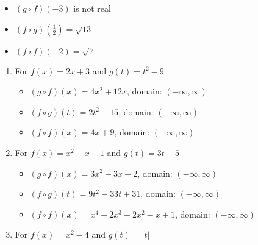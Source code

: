 \begin{enumerate}
\begin{multicols}{3}

\begin{itemize}

\item  $(g\circ f)(-3)$ is not real

\item  $(f\circ g)\left(\frac{1}{2}\right) = \sqrt{13}$

\item  $(f \circ f)(-2) = \sqrt{7}$

\end{itemize}

\end{multicols}
\setcounter{HW}{\value{enumi}}
\end{enumerate}

\begin{enumerate}
\setcounter{enumi}{\value{HW}}

\item For $f(x) = 2x+3$ and $g(t) = t^2-9$

\begin{itemize}

\item  $(g \circ f)(x) = 4x^2+12x$, domain: $(-\infty, \infty)$

\item  $(f \circ g)(t) = 2t^2-15$, domain: $(-\infty, \infty)$

\item  $(f \circ f)(x) = 4x+9$, domain: $(-\infty, \infty)$

\end{itemize}


\item For  $f(x) = x^2 -x+1$ and $g(t) = 3t-5$ 

\begin{itemize}

\item  $(g \circ f)(x) = 3x^2-3x-2$, domain: $(-\infty, \infty)$

\item  $(f \circ g)(t) =9t^2-33t+31$, domain: $(-\infty, \infty)$

\item  $(f \circ f)(x) = x^4-2x^3+2x^2-x+1$, domain: $(-\infty, \infty)$

\end{itemize}

\item For  $f(x) = x^2-4$ and $g(t) = |t|$ 


\end{enumerate}
